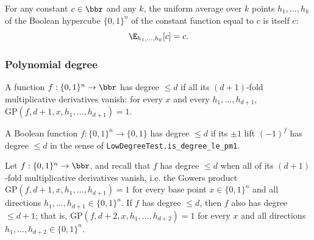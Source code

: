 \begin{lemma}
\label{LowDegreeTest.multi_expectation_const}
\leanok
{}
For any constant $c \in \bbr$ and any $k$, the uniform average over $k$ points
$h_1,\ldots,h_k$ of the Boolean hypercube $\{0,1\}^n$ of the constant function equal to
$c$ is itself $c$:
\[
  \E_{h_1,\ldots,h_k}[c] = c.
\]
\end{lemma}

\subsubsection{Polynomial degree}

\begin{definition}
\label{LowDegreeTest.is_degree_le_pm1}
\leanok
{}
A function $f : \{0,1\}^n \to \bbr$ has degree $\le d$ if all its $(d{+}1)$-fold
multiplicative derivatives vanish: for every $x$ and every $h_1,\ldots,h_{d+1}$,
$\mathrm{GP}(f, d{+}1, x, h_1,\ldots,h_{d+1}) = 1$.
\end{definition}

\begin{definition}
\label{LowDegreeTest.is_degree_le_bool}
\leanok
{}
A Boolean function $f : \{0,1\}^n \to \{0,1\}$ has degree $\le d$ if its $\pm 1$
lift $(-1)^f$ has degree $\le d$ in the sense of \texttt{LowDegreeTest.is\_degree\_le\_pm1}.
\end{definition}

\begin{lemma}
\label{LowDegreeTest.degree_le_succ}
\leanok
{}
Let $f : \{0,1\}^n \to \bbr$, and recall that $f$ has degree $\le d$ when all of its
$(d{+}1)$-fold multiplicative derivatives vanish, i.e. the Gowers product
$\mathrm{GP}(f, d{+}1, x, h_1,\ldots,h_{d+1}) = 1$ for every base point $x \in
\{0,1\}^n$ and all directions $h_1,\ldots,h_{d+1} \in \{0,1\}^n$. If $f$ has degree $\le
d$, then $f$ also has degree $\le d+1$; that is, $\mathrm{GP}(f, d{+}2, x,
h_1,\ldots,h_{d+2}) = 1$ for every $x$ and all directions $h_1,\ldots,h_{d+2} \in
\{0,1\}^n$.
\end{lemma}

